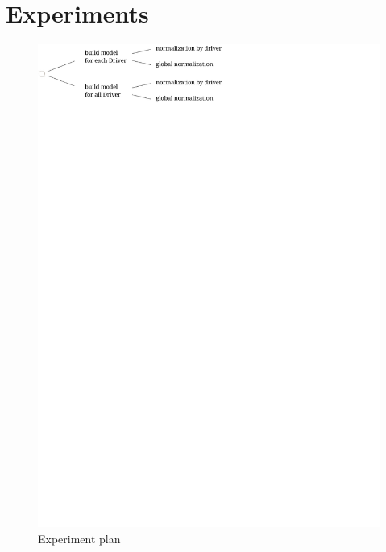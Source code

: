 \documentclass{vldb}
\begin{document}
\section{Experiments}
\label{sec:Experiments}


\begin{figure}
\centering
\includegraphics[trim=0cm 26cm 9.5cm 0cm, clip=true, width=\linewidth]{"pics/experiment-plan"}
\caption{Experiment plan}
\label{fig:Exp-plan}
\end{figure}
\end{document}
